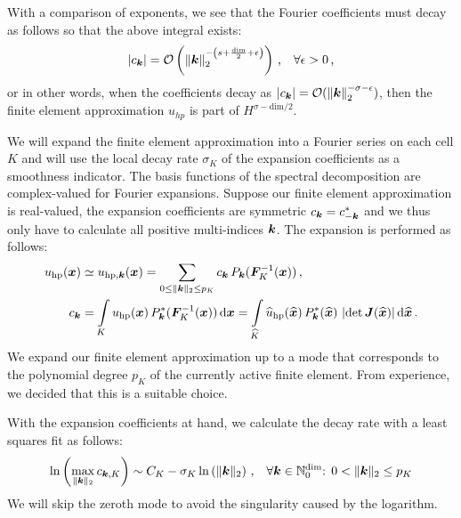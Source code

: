 With a comparison of exponents, we see that the Fourier coefficients must decay as follows so that the above integral exists:
\begin{align}
|c_\tuple{k}| = \mathcal{O}\left( \left\|\tuple{k}\right\|_2^{-\left(s + \frac{\text{dim}}{2} + \epsilon \right)} \right) \,\text{,} \quad \forall \epsilon > 0 \,\text{,}
\end{align}
or in other words, when the coefficients decay as $\left| c_\tuple{k} \right| = \mathcal{O}( \left\|\tuple{k}\right\|_2^{-\sigma-\epsilon} )$, then the finite element approximation $u_{hp}$ is part of $H^{\sigma - \text{dim}/2}$. \textcite{dealiistep-27}

We will expand the finite element approximation into a Fourier series on each cell $K$ and will use the local decay rate $\sigma_K$ of the expansion coefficients as a smoothness indicator. The basis functions of the spectral decomposition are complex-valued for Fourier expansions. Suppose our finite element approximation is real-valued, the expansion coefficients are symmetric $c_\tuple{k} = c_{-\tuple{k}}^*$ and we thus only have to calculate all positive multi-indices $\tuple{k}$. The expansion is performed as follows:
\begin{align}
u_{\text{hp}}(\vec{x}) &\simeq u_{\text{hp}, \tuple{k}}(\vec{x}) = \sum\limits_{0 \leq \|\tuple{k}\|_2 \leq p_K} c_\tuple{k} \, P_\tuple{k}(\mat{F}_K^{-1}(\vec{x})) \,\text{,} \\
c_\tuple{k} &=
\int\limits_K u_{\text{hp}}(\vec{x}) \, P_\tuple{k}^\ast(\mat{F}_K^{-1}(\vec{x})) \differential{\vec{x}} =
\int\limits_{\widehat{K}} \widehat{u}_{\text{hp}}(\vec{\widehat{x}}) \, P_\tuple{k}^\ast(\vec{\widehat{x}}) \, \left|\det \mat{J}(\vec{\widehat{x}})\right| \differential{\vec{\widehat{x}}} \,\text{.}
\end{align}
We expand our finite element approximation up to a mode that corresponds to the polynomial degree $p_K$ of the currently active finite element. From experience, we decided that this is a suitable choice. \textcite{dealiifourier}

With the expansion coefficients at hand, we calculate the decay rate with a least squares fit as follows:
\begin{align}
\ln\left( \max\limits_{\|\tuple{k}\|_2} c_{\tuple{k}, K} \right) \sim C_K - \sigma_K  \ln\left( \|\tuple{k}\|_2 \right) \,\text{,} \quad \forall \tuple{k} \in \mathbb{N}_0^\text{dim} \text{: } 0 < \|\tuple{k}\|_2 \leq p_K
\end{align}
We will skip the zeroth mode to avoid the singularity caused by the logarithm.

